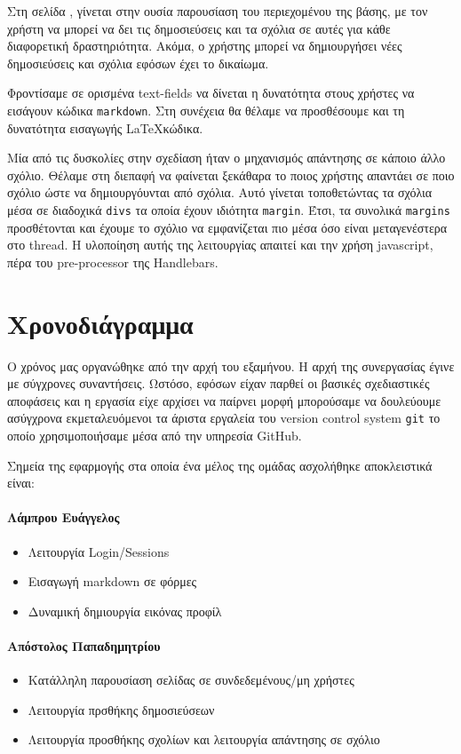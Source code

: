 \documentclass[nonacm, language=english, language=greek]{acmart}
\newcommand{\en}[1]{\textlatin{#1}}
\newcommand{\src}[1]{\texttt{\en{#1}}}
\begin{document}
Στη σελίδα \say{\en{Activities}}, γίνεται στην ουσία παρουσίαση του
περιεχομένου της βάσης, με τον χρήστη να μπορεί να δει τις δημοσιεύσεις και τα
σχόλια σε αυτές για κάθε διαφορετική δραστηριότητα. Ακόμα, ο χρήστης μπορεί να
δημιουργήσει νέες δημοσιεύσεις και σχόλια εφόσων έχει το δικαίωμα.

Φροντίσαμε σε ορισμένα \en{text-fields} να δίνεται η δυνατότητα 
στους χρήστες να εισάγουν κώδικα \src{markdown}. Στη συνέχεια 
θα θέλαμε να προσθέσουμε και τη δυνατότητα εισαγωγής \LaTeX κώδικα.

Μία από τις δυσκολίες στην σχεδίαση ήταν ο μηχανισμός απάντησης
σε κάποιο άλλο σχόλιο. Θέλαμε στη διεπαφή να φαίνεται 
ξεκάθαρα το ποιος χρήστης απαντάει σε ποιο σχόλιο
ώστε να δημιουργόυνται  από σχόλια.
Αυτό γίνεται τοποθετώντας τα σχόλια μέσα σε διαδοχικά \src{divs}
τα οποία έχουν ιδιότητα \src{margin}. Έτσι, τα συνολικά 
\src{margins} προσθέτονται και έχουμε το σχόλιο να εμφανίζεται πιο μέσα 
όσο είναι μεταγενέστερα στο \en{thread}. Η υλοποίηση αυτής 
της λειτουργίας απαιτεί και την χρήση \en{javascript}, πέρα 
του \en{pre-processor} της \en{Handlebars}.

\section{Χρονοδιάγραμμα}

Ο χρόνος μας οργανώθηκε από την αρχή του εξαμήνου. Η αρχή της συνεργασίας έγινε
με σύγχρονες συναντήσεις. Ωστόσο, εφόσων είχαν παρθεί οι βασικές σχεδιαστικές
αποφάσεις και η εργασία είχε αρχίσει να παίρνει μορφή μπορούσαμε να δουλεύουμε
ασύγχρονα εκμεταλευόμενοι τα άριστα εργαλεία του \en{version control system}
\src{git} \cite{git} το οποίο χρησιμοποιήσαμε μέσα από την υπηρεσία
\en{GitHub}.

Σημεία της εφαρμογής στα οποία ένα μέλος της ομάδας ασχολήθηκε
αποκλειστικά είναι: 

\paragraph{Λάμπρου Ευάγγελος}
\begin{itemize}
    \item Λειτουργία \en{Login/Sessions}
    \item Εισαγωγή \en{markdown} σε φόρμες
    \item Δυναμική δημιουργία εικόνας προφίλ
\end{itemize}

\paragraph{Απόστολος Παπαδημητρίου}
\begin{itemize}
    \item Κατάλληλη παρουσίαση σελίδας σε συνδεδεμένους/μη χρήστες
    \item Λειτουργία πρσθήκης δημοσιεύσεων
    \item Λειτουργία προσθήκης σχολίων και 
        λειτουργία απάντησης σε σχόλιο
\end{itemize}
\end{document}
